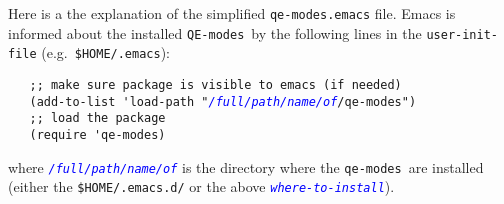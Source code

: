 \documentclass[12pt,a4paper]{article}
\def\QEmodes{\texttt{QE-modes}}
\def\qemodes{\texttt{qe-modes}}
\def\var#1{\textcolor{Blue}{\texttt{\textit{#1}}}}
\begin{document}
Here is a the explanation of the simplified \texttt{qe-modes.emacs}
file.  Emacs is informed about the installed \QEmodes\ by the
following lines in the \verb+user-init-file+ (e.g.\
\verb+$HOME/.emacs+):
\begin{flushleft}
{\color{red}
\verb+   ;; make sure package is visible to emacs (if needed)+}\\
\verb+   (add-to-list 'load-path "+\var{/full/path/name/of}\verb+/qe-modes")+\\[1em]
{\color{red}
\verb+   ;; load the package+}\\
\verb+   (require 'qe-modes)+
\end{flushleft}
where \var{/full/path/name/of} is the directory where the \qemodes\
are installed (either the \texttt{\$HOME/.emacs.d/} or the above
\var{where-to-install}).
\end{document}
